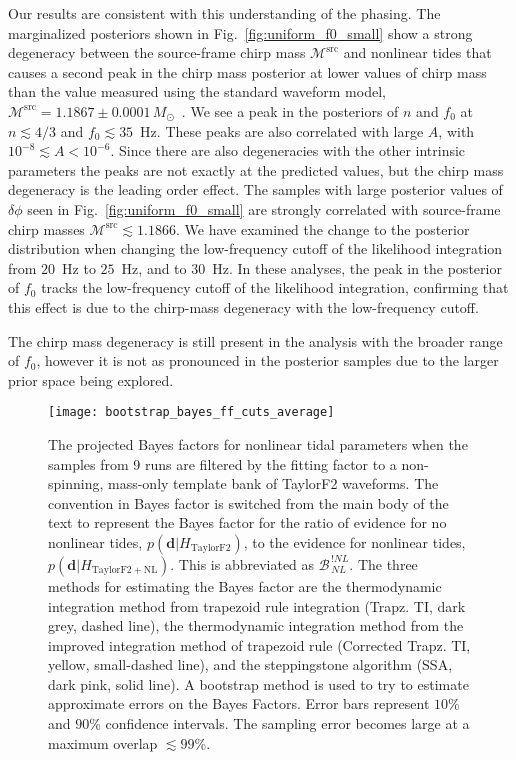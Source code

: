 Our results are consistent with this understanding of the phasing. The marginalized posteriors shown in Fig.~\ref{fig:uniform_f0_small} show a strong degeneracy between the source-frame chirp mass $\mathcal{M}^\textrm{src}$ and nonlinear tides that causes a second peak in the chirp mass posterior at lower values of chirp mass than the value measured using the standard waveform model, $\mathcal{M}^\textrm{src} = 1.1867\pm0.0001\, M_\odot$~\citep{de2018tidal}. We see a peak in the posteriors of $n$ and $f_0$ at $n \lesssim 4/3$ and $f_0 \lesssim 35$~Hz. These peaks are also correlated with large $A$, with $10^{-8} \lesssim A < 10^{-6}$. Since there are also degeneracies with the other intrinsic parameters the peaks are not exactly at the predicted values, but the chirp mass degeneracy is the leading order effect. The samples with large posterior values of $\delta\phi$ seen in Fig.~\ref{fig:uniform_f0_small} are strongly correlated with source-frame chirp masses $\mathcal{M}^\textrm{src} \lesssim 1.1866.$ We have examined the change to the posterior distribution when changing the low-frequency cutoff of the likelihood integration from $20$~Hz to $25$~Hz, and to $30$~Hz. In these analyses, the peak in the posterior of $f_0$ tracks the low-frequency cutoff of the likelihood integration, confirming that this effect is due to the chirp-mass degeneracy with the low-frequency cutoff.

The chirp mass degeneracy is still present in the analysis with the broader range of $f_0$, however it is not as pronounced in the posterior samples due to the larger prior space being explored.

\begin{figure}[th]
\texttt{[image: bootstrap\_bayes\_ff\_cuts\_average]}\caption{The projected Bayes factors for nonlinear tidal parameters when the samples from 9 runs are filtered by the fitting factor to a non-spinning, mass-only template bank of TaylorF2 waveforms. The convention in Bayes factor is switched from the main body of the text to represent the Bayes factor for the ratio of evidence for no nonlinear tides, $p\left(\mathbf{d}|H_\mathrm{TaylorF2}\right)$, to the evidence for nonlinear tides, $p\left(\mathbf{d}|H_\mathrm{TaylorF2+NL}\right)$. This is abbreviated as $\mathcal{B}^{\,!NL}_{\,NL}$. The three methods for estimating the Bayes factor are the thermodynamic integration method from trapezoid rule integration (Trapz. TI, dark grey, dashed line), the thermodynamic integration method from the improved integration method of trapezoid rule (Corrected Trapz. TI, yellow, small-dashed line), and the steppingstone algorithm (SSA, dark pink, solid line). A bootstrap method is used to try to estimate approximate errors on the Bayes Factors. Error bars represent $10$\% and $90$\% confidence intervals. The sampling error becomes large at a maximum overlap $\lesssim 99$\%.
}
\label{fig:bayes_ff_plot}
\end{figure}


